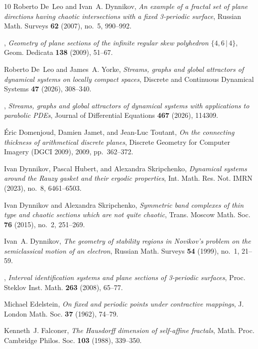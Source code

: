 \documentclass[11pt]{amsart}
\theoremstyle{definition}
\theoremstyle{remark}
\begin{document}
\begin{thebibliography}{10}
Roberto De~Leo and Ivan~A. Dynnikov, \emph{An example of a fractal set of plane
  directions having chaotic intersections with a fixed 3-periodic surface},
  Russian Math. Surveys \textbf{62} (2007), no.~5, 990--992.

\bysame, \emph{Geometry of plane sections of the infinite regular skew
  polyhedron $\{4,6\,|\,4\}$}, Geom. Dedicata \textbf{138} (2009), 51--67.

Roberto De~Leo and James~A. Yorke, \emph{Streams, graphs and global attractors
  of dynamical systems on locally compact spaces}, Discrete and Continuous
  Dynamical Systems \textbf{47} (2026), 308--340.

\bysame, \emph{Streams, graphs and global attractors of dynamical systems with
  applications to parabolic {PDE}s}, Journal of Differential Equations
  \textbf{467} (2026), 114309.

{\'E}ric Domenjoud, Damien Jamet, and Jean-Luc Toutant, \emph{On the connecting
  thickness of arithmetical discrete planes}, Discrete Geometry for Computer
  Imagery (DGCI 2009), 2009, pp.~362--372.

Ivan Dynnikov, Pascal Hubert, and Alexandra Skripchenko, \emph{Dynamical
  systems around the {R}auzy gasket and their ergodic properties}, Int. Math.
  Res. Not. IMRN (2023), no.~8, 6461--6503.

Ivan Dynnikov and Alexandra Skripchenko, \emph{Symmetric band complexes of thin
  type and chaotic sections which are not quite chaotic}, Trans. Moscow Math.
  Soc. \textbf{76} (2015), no.~2, 251--269.

Ivan~A. Dynnikov, \emph{The geometry of stability regions in {N}ovikov's
  problem on the semiclassical motion of an electron}, Russian Math. Surveys
  \textbf{54} (1999), no.~1, 21--59.

\bysame, \emph{Interval identification systems and plane sections of 3-periodic
  surfaces}, Proc. Steklov Inst. Math. \textbf{263} (2008), 65--77.

Michael Edelstein, \emph{On fixed and periodic points under contractive
  mappings}, J. London Math. Soc. \textbf{37} (1962), 74--79.

Kenneth~J. Falconer, \emph{The {H}ausdorff dimension of self-affine fractals},
  Math. Proc. Cambridge Philos. Soc. \textbf{103} (1988), 339--350.


\end{thebibliography}
\end{document}
